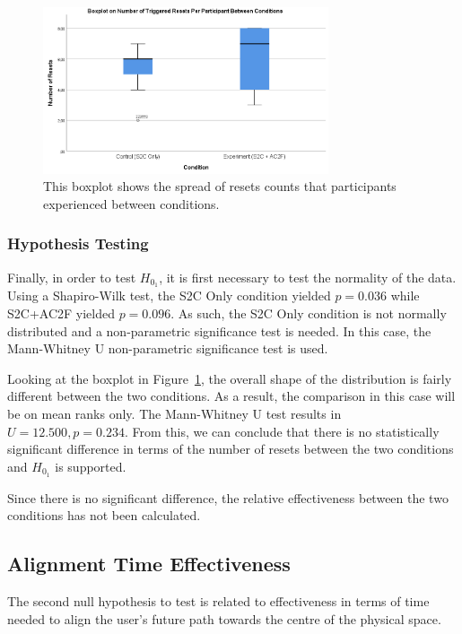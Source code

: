\begin{figure}[tbph]
    \centering
    \includegraphics[width=0.75\textwidth]{figures/graphs/resetCountBoxPlot.png}
    \caption[Boxplot of Number of Resets Per Participant Between Conditions for Experiment 2]{This boxplot shows the spread of resets counts that participants experienced between conditions.}
    \label{fig:ex2resetboxplot}
\end{figure}

\subsubsection{Hypothesis Testing}
Finally, in order to test $H_{0_1}$, it is first necessary to test the normality of the data. Using a Shapiro-Wilk test, the S2C Only condition yielded $p = 0.036$ while S2C+AC2F yielded $p = 0.096$. As such, the S2C Only condition is not normally distributed and a non-parametric significance test is needed. In this case, the Mann-Whitney U non-parametric significance test is used. 

Looking at the boxplot in Figure~\ref{fig:ex2resetboxplot}, the overall shape of the distribution is fairly different between the two conditions. As a result, the comparison in this case will be on mean ranks only. The Mann-Whitney U test results in $U = 12.500, p = 0.234$. From this, we can conclude that there is no statistically significant difference in terms of the number of resets between the two conditions and $H_{0_1}$ is supported.

Since there is no significant difference, the relative effectiveness between the two conditions has not been calculated.

\subsection{Alignment Time Effectiveness}
The second null hypothesis to test is related to effectiveness in terms of time needed to align the user's future path towards the centre of the physical space. 

